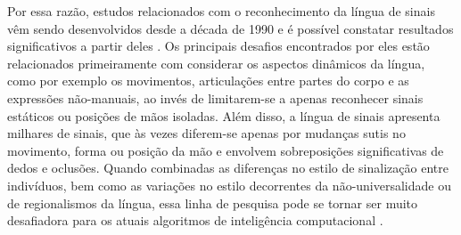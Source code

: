 
Por essa razão, estudos relacionados com o reconhecimento da língua de sinais vêm sendo desenvolvidos desde a década de 1990 e é possível constatar resultados significativos a partir deles \cite{lim-2016, recent-advances-dl-2017}. Os principais desafios encontrados por eles estão relacionados primeiramente com considerar os aspectos dinâmicos da língua, como por exemplo os movimentos, articulações entre partes do corpo e as expressões não-manuais, ao invés de limitarem-se a apenas reconhecer sinais estáticos ou posições de mãos isoladas. Além disso, a língua de sinais apresenta milhares de sinais, que às vezes diferem-se apenas por mudanças sutis no movimento, forma ou posição da mão e envolvem sobreposições significativas de dedos e oclusões. Quando combinadas as diferenças no estilo de sinalização entre indivíduos, bem como as variações no estilo decorrentes da não-universalidade ou de regionalismos da língua, essa linha de pesquisa pode se tornar ser muito desafiadora para os atuais algoritmos de inteligência computacional \cite{konstantinidis-2018}.


